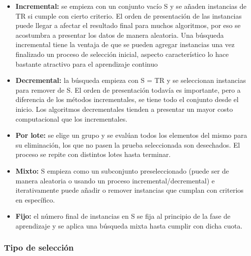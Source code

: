 \begin{itemize}
\item \textbf{Incremental:}
se empieza con un conjunto vacío S y se añaden instancias de TR si cumple con cierto criterio. El orden de presentación de las instancias puede llegar a afectar el resultado final para muchos algoritmos, por eso se acostumbra a presentar los datos de manera aleatoria. Una búsqueda incremental tiene la ventaja de que se pueden agregar instancias una vez finalizado un proceso de selección inicial, aspecto característico lo hace bastante atractivo para el aprendizaje continuo

\item \textbf{Decremental:}
la búsqueda empieza con S = TR y se seleccionan instancias para remover de S. El orden de presentación todavía es importante, pero a diferencia de los métodos incrementales, se tiene todo el conjunto desde el inicio. Los algoritmos decrementales tienden a presentar un mayor costo computacional que los incrementales.

\item \textbf{Por lote:}
se elige un grupo y se evalúan todos los elementos del mismo para su eliminación, los que no pasen la prueba seleccionada son desechados. El proceso se repite con distintos lotes hasta terminar.

\item \textbf{Mixto:}
S empieza como un subconjunto preseleccionado (puede ser de manera aleatoria o usando un proceso incremental/decremental) e iterativamente puede añadir o remover instancias que cumplan con criterios en específico.

\item \textbf{Fijo:}
el número final de instancias en S se fija al principio de la fase de aprendizaje y se aplica una búsqueda mixta hasta cumplir con dicha cuota.
\end{itemize}

\subsubsection{Tipo de selección}

